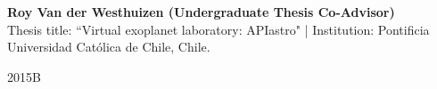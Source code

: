 \documentclass[12pt, a4paper]{article} %
\begin{document}
\begin{minipage}[t]{0.7\textwidth}
\begin{flushleft}%
  \setlength{\leftskip}{0.2cm}%
\textbf{Roy Van der Westhuizen (Undergraduate Thesis Co-Advisor)}\\
Thesis title: ``Virtual exoplanet laboratory: APIastro" | Institution: Pontificia Universidad Cat\'olica de Chile, Chile.
\end{flushleft}
\end{minipage}
\begin{minipage}[t]{0.3\textwidth}
\hfill 2015B
\end{minipage}
\end{document}
